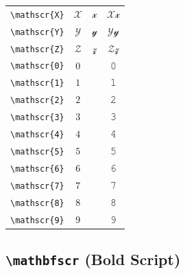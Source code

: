\documentclass[12pt,a4paper]{article}
\begin{document}
\begin{longtable}{|c|c|c|c|}
\verb|\mathscr{X}| & $\mathscr{X}$ & $\mathscr{x}$ & $ 𝒳 𝓍 $ \\
\verb|\mathscr{Y}| & $\mathscr{Y}$ & $\mathscr{y}$ & $ 𝒴 𝓎 $ \\
\verb|\mathscr{Z}| & $\mathscr{Z}$ & $\mathscr{z}$ & $ 𝒵 𝓏 $ \\
\verb|\mathscr{0}| & $\mathscr{0}$ & & 𝟶 \\
\verb|\mathscr{1}| & $\mathscr{1}$ & & 𝟷 \\
\verb|\mathscr{2}| & $\mathscr{2}$ & & 𝟸 \\
\verb|\mathscr{3}| & $\mathscr{3}$ & & 𝟹 \\
\verb|\mathscr{4}| & $\mathscr{4}$ & & 𝟺 \\
\verb|\mathscr{5}| & $\mathscr{5}$ & & 𝟻 \\
\verb|\mathscr{6}| & $\mathscr{6}$ & & 𝟼 \\
\verb|\mathscr{7}| & $\mathscr{7}$ & & 𝟽 \\
\verb|\mathscr{8}| & $\mathscr{8}$ & & 𝟾 \\
\verb|\mathscr{9}| & $\mathscr{9}$ & & 𝟿 \\
\hline
\end{longtable}

\newpage

\subsection*{\texttt{\textbackslash{}mathbfscr} (Bold Script)}
\end{document}

